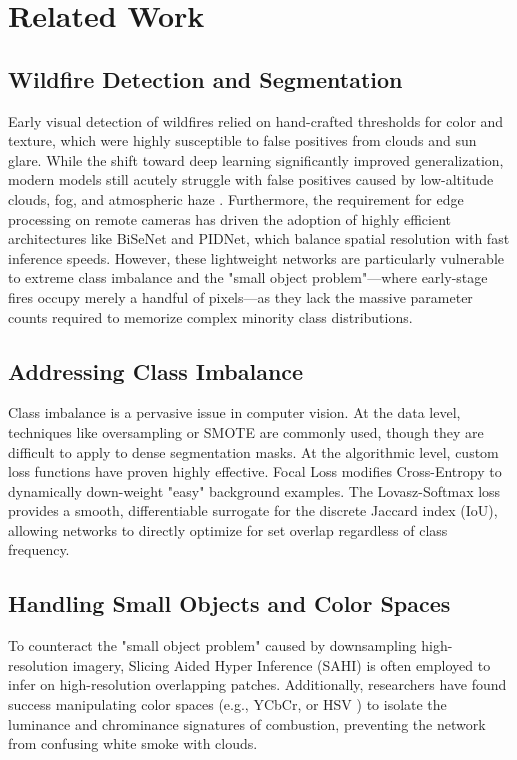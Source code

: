 \documentclass[conference]{IEEEtran}
\begin{document}
\section{Related Work}

\subsection{Wildfire Detection and Segmentation}
Early visual detection of wildfires relied on hand-crafted thresholds for color and texture, which were highly susceptible to false positives from clouds and sun glare. While the shift toward deep learning significantly improved generalization, modern models still acutely struggle with false positives caused by low-altitude clouds, fog, and atmospheric haze \cite{govil2020preliminary, nguyen2023smokeynet}. Furthermore, the requirement for edge processing on remote cameras has driven the adoption of highly efficient architectures like BiSeNet and PIDNet, which balance spatial resolution with fast inference speeds. However, these lightweight networks are particularly vulnerable to extreme class imbalance and the "small object problem"---where early-stage fires occupy merely a handful of pixels---as they lack the massive parameter counts required to memorize complex minority class distributions.

\subsection{Addressing Class Imbalance}
Class imbalance is a pervasive issue in computer vision. At the data level, techniques like oversampling or SMOTE are commonly used, though they are difficult to apply to dense segmentation masks. At the algorithmic level, custom loss functions have proven highly effective. Focal Loss \cite{focal} modifies Cross-Entropy to dynamically down-weight "easy" background examples. The Lovasz-Softmax loss \cite{lovasz} provides a smooth, differentiable surrogate for the discrete Jaccard index (IoU), allowing networks to directly optimize for set overlap regardless of class frequency.

\subsection{Handling Small Objects and Color Spaces}
To counteract the "small object problem" caused by downsampling high-resolution imagery, Slicing Aided Hyper Inference (SAHI) \cite{sahi} is often employed to infer on high-resolution overlapping patches. Additionally, researchers have found success manipulating color spaces (e.g., YCbCr, or HSV \cite{muhammad2023fire}) to isolate the luminance and chrominance signatures of combustion, preventing the network from confusing white smoke with clouds.
\end{document}
